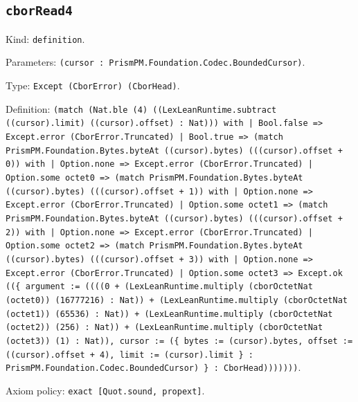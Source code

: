 \documentclass[11pt]{article}
\begin{document}
\subsection*{\texttt{cborRead4}}
\noindent Kind: \texttt{definition}.\par
\noindent Parameters: \texttt{(cursor : PrismPM.Foundation.Codec.BoundedCursor)}.\par
\noindent Type: \texttt{Except (CborError) (CborHead)}.\par
\noindent Definition: \texttt{(match (Nat.ble (4) ((LexLeanRuntime.subtract ((cursor).limit) ((cursor).offset) : Nat))) with | Bool.false => Except.error (CborError.Truncated) | Bool.true => (match PrismPM.Foundation.Bytes.byteAt ((cursor).bytes) (((cursor).offset + 0)) with | Option.none => Except.error (CborError.Truncated) | Option.some octet0 => (match PrismPM.Foundation.Bytes.byteAt ((cursor).bytes) (((cursor).offset + 1)) with | Option.none => Except.error (CborError.Truncated) | Option.some octet1 => (match PrismPM.Foundation.Bytes.byteAt ((cursor).bytes) (((cursor).offset + 2)) with | Option.none => Except.error (CborError.Truncated) | Option.some octet2 => (match PrismPM.Foundation.Bytes.byteAt ((cursor).bytes) (((cursor).offset + 3)) with | Option.none => Except.error (CborError.Truncated) | Option.some octet3 => Except.ok ((\{ argument := ((((0 + (LexLeanRuntime.multiply (cborOctetNat (octet0)) (16777216) : Nat)) + (LexLeanRuntime.multiply (cborOctetNat (octet1)) (65536) : Nat)) + (LexLeanRuntime.multiply (cborOctetNat (octet2)) (256) : Nat)) + (LexLeanRuntime.multiply (cborOctetNat (octet3)) (1) : Nat)), cursor := (\{ bytes := (cursor).bytes, offset := ((cursor).offset + 4), limit := (cursor).limit \} : PrismPM.Foundation.Codec.BoundedCursor) \} : CborHead)))))))}.\par
\noindent Axiom policy: \texttt{exact [Quot.sound, propext]}.\par
\end{document}
